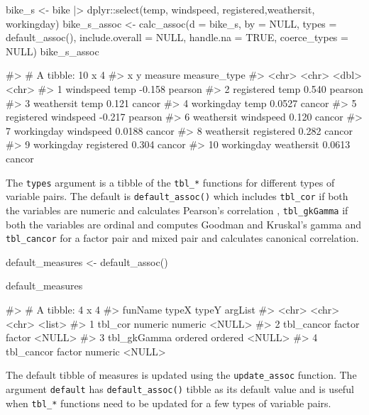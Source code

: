 \begin{Schunk}
\begin{Sinput}
bike_s <- bike |> 
  dplyr::select(temp, windspeed, registered,weathersit, workingday)
bike_s_assoc <- calc_assoc(d = bike_s,
                           by = NULL,
                           types = default_assoc(),
                           include.overall = NULL,
                           handle.na = TRUE,
                           coerce_types = NULL)
bike_s_assoc
\end{Sinput}
\begin{Soutput}
#> # A tibble: 10 x 4
#>    x          y          measure measure_type
#>    <chr>      <chr>        <dbl> <chr>       
#>  1 windspeed  temp       -0.158  pearson     
#>  2 registered temp        0.540  pearson     
#>  3 weathersit temp        0.121  cancor      
#>  4 workingday temp        0.0527 cancor      
#>  5 registered windspeed  -0.217  pearson     
#>  6 weathersit windspeed   0.120  cancor      
#>  7 workingday windspeed   0.0188 cancor      
#>  8 weathersit registered  0.282  cancor      
#>  9 workingday registered  0.304  cancor      
#> 10 workingday weathersit  0.0613 cancor
\end{Soutput}
\end{Schunk}

The \texttt{types} argument is a tibble of the \texttt{tbl\_*} functions
for different types of variable pairs. The default is
\texttt{default\_assoc()} which includes \texttt{tbl\_cor} if both the
variables are numeric and calculates Pearson's correlation ,
\texttt{tbl\_gkGamma} if both the variables are ordinal and computes
Goodman and Kruskal's gamma and \texttt{tbl\_cancor} for a factor pair
and mixed pair and calculates canonical correlation.

\begin{Schunk}
\begin{Sinput}
default_measures <- default_assoc()

default_measures
\end{Sinput}
\begin{Soutput}
#> # A tibble: 4 x 4
#>   funName     typeX   typeY   argList
#>   <chr>       <chr>   <chr>   <list> 
#> 1 tbl_cor     numeric numeric <NULL> 
#> 2 tbl_cancor  factor  factor  <NULL> 
#> 3 tbl_gkGamma ordered ordered <NULL> 
#> 4 tbl_cancor  factor  numeric <NULL>
\end{Soutput}
\end{Schunk}

The default tibble of measures is updated using the
\texttt{update\_assoc} function. The argument \texttt{default} has
\texttt{default\_assoc()} tibble as its default value and is useful when
\texttt{tbl\_*} functions need to be updated for a few types of variable
pairs.

